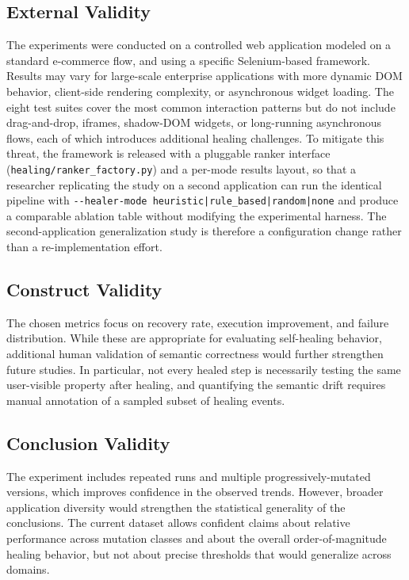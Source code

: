\documentclass[conference]{IEEEtran}
\begin{document}
\subsection{External Validity}
The experiments were conducted on a controlled web application modeled on a standard e-commerce flow, and using a specific Selenium-based framework. Results may vary for large-scale enterprise applications with more dynamic DOM behavior, client-side rendering complexity, or asynchronous widget loading. The eight test suites cover the most common interaction patterns but do not include drag-and-drop, iframes, shadow-DOM widgets, or long-running asynchronous flows, each of which introduces additional healing challenges. To mitigate this threat, the framework is released with a pluggable ranker interface (\texttt{healing/ranker\_factory.py}) and a per-mode results layout, so that a researcher replicating the study on a second application can run the identical pipeline with \texttt{-{}-healer-mode heuristic|rule\_based|random|none} and produce a comparable ablation table without modifying the experimental harness. The second-application generalization study is therefore a configuration change rather than a re-implementation effort.

\subsection{Construct Validity}
The chosen metrics focus on recovery rate, execution improvement, and failure distribution. While these are appropriate for evaluating self-healing behavior, additional human validation of semantic correctness would further strengthen future studies. In particular, not every healed step is necessarily testing the same user-visible property after healing, and quantifying the semantic drift requires manual annotation of a sampled subset of healing events.

\subsection{Conclusion Validity}
The experiment includes repeated runs and multiple progressively-mutated versions, which improves confidence in the observed trends. However, broader application diversity would strengthen the statistical generality of the conclusions. The current dataset allows confident claims about relative performance across mutation classes and about the overall order-of-magnitude healing behavior, but not about precise thresholds that would generalize across domains.
\end{document}
